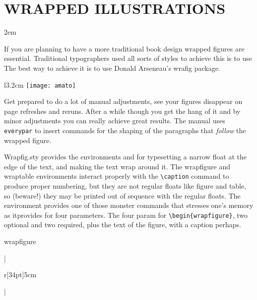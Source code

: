 \chapter{WRAPPED ILLUSTRATIONS}
\parindent2em
\let\onepar\lorem

If you are planning to have a more traditional book design wrapped figures are essential. Traditional typographers used
all sorts of styles to achieve this is to use
The best way to achieve it is to use Donald Arseneau's wrafig package.

\begin{wrapfigure}{l}{3.2cm}
    \texttt{[image: amato]}
    \caption{\footnotesize Wrapped figures}
\end{wrapfigure}

Get prepared to do a lot of manual adjustments, see your figures disappear on page refreshes and reruns. After a while though you get the hang of it and by minor adjustments you can really achieve great results. The manual uses \verb+everypar+ to insert commands for the shaping of the paragraphs that \emph{follow} the wrapped figure.

Wrapfig.sty provides the environments  and  for typesetting a
narrow float at the edge of the text, and making the text wrap around it. The wrapfigure
and wraptable environments interact properly with the \verb+\caption+ command to produce
proper numbering, but they are not regular floats like figure and table, so (beware!)
they may be printed out of sequence with the regular floats. The environment  provides one of those monster commands that stresses one's memory as itprovides for four parameters. 
The four param
for \verb+\begin{wrapfigure}+, two optional and two required, plus the text of the figure, with a caption perhaps.

\begin{macro}{wrapfigure}
\end{macro}

|\begin{wrapfigure}[12]{r}[34pt]{5cm}\end{wrapfigure}|




